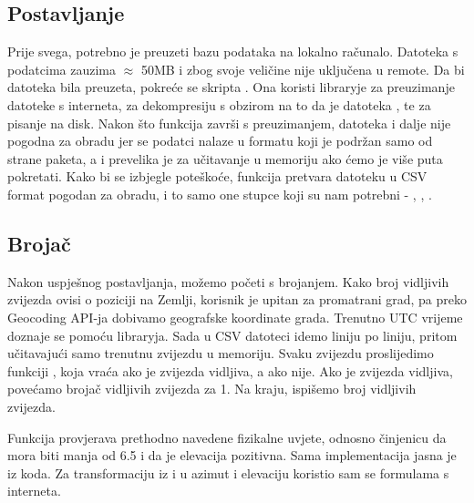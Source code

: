\subsection{Postavljanje}
Prije svega, potrebno je preuzeti bazu podataka na lokalno računalo. Datoteka s podatcima zauzima $\approx$ 50MB i zbog svoje veličine nije uključena u remote.
Da bi datoteka bila preuzeta, pokreće se skripta . Ona koristi libraryje  za preuzimanje datoteke s interneta,  za dekompresiju s obzirom na to da je datoteka , te  za pisanje na disk. Nakon što funkcija  završi s preuzimanjem, datoteka  i dalje nije pogodna za obradu jer se podatci nalaze u formatu koji je podržan samo od strane  paketa, a i prevelika je za učitavanje u memoriju ako ćemo je više puta pokretati. Kako bi se izbjegle poteškoće, funkcija  pretvara datoteku u CSV format pogodan za obradu, i to samo one stupce koji su nam potrebni - , , .

\subsection{Brojač}
Nakon uspješnog postavljanja, možemo početi s brojanjem.
Kako broj vidljivih zvijezda ovisi o poziciji na Zemlji, korisnik je upitan za promatrani grad, pa preko Geocoding API-ja dobivamo geografske koordinate grada. Trenutno UTC vrijeme doznaje se pomoću  libraryja.
Sada u CSV datoteci idemo liniju po liniju, pritom učitavajući samo trenutnu zvijezdu u memoriju. Svaku zvijezdu proslijedimo funkciji , koja vraća  ako je zvijezda vidljiva, a  ako nije. Ako je zvijezda vidljiva, povećamo brojač vidljivih zvijezda za 1. Na kraju, ispišemo broj vidljivih zvijezda.

Funkcija  provjerava prethodno navedene fizikalne uvjete, odnosno činjenicu da  mora biti manja od 6.5 i da je elevacija pozitivna. Sama implementacija jasna je iz koda. Za transformaciju iz  i  u azimut i elevaciju koristio sam se formulama s interneta. \cite{ct:transform} 

